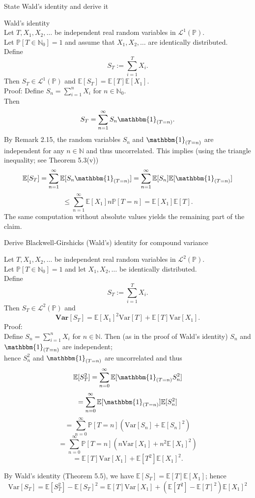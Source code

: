 \documentclass[11pt,a4paper,twoside]{article}
\begin{document}
State Wald's identity and derive it

Wald’s identity \\
Let $ T, X_1, X_2, \dots $ be independent real random variables in $ \mathcal{L}^1(\mathbb{P}) $. \\
Let $ \mathbb{P}[T \in \mathbb{N}_0] = 1 $ and assume that $ X_1, X_2, \dots $ are identically distributed. \\
Define
$$
S_T := \sum_{i=1}^{T} X_i.
$$
Then $ S_T \in \mathcal{L}^1(\mathbb{P}) $ and $ \mathbb{E}[S_T] = \mathbb{E}[T] \mathbb{E}[X_1] $. \\

\newline
Proof: Define $ S_n = \sum_{i=1}^{n} X_i $ for $ n \in \mathbb{N}_0 $. \\
Then 
$$
S_T = \sum_{n=1}^{\infty} S_n \mathbbm{1}_{(T=n)}.
$$
By Remark 2.15, the random variables $ S_n $ and $ \mathbbm{1}_{(T=n)} $ are independent for any $ n \in \mathbb{N} $ and thus uncorrelated. This implies (using the triangle inequality; see Theorem 5.3(v)) \\
$$
\mathbb{E}[S_T] = \sum_{n=1}^{\infty} \mathbb{E}[S_n \mathbbm{1}_{(T=n)}] 
= \sum_{n=1}^{\infty} \mathbb{E}[S_n] \mathbb{E}[\mathbbm{1}_{(T=n)}]
$$
$$
\leq \sum_{n=1}^{\infty} \mathbb{E}[X_1] n \mathbb{P}[T = n] = \mathbb{E}[X_1] \mathbb{E}[T].
$$
The same computation without absolute values yields the remaining part of the claim.

Derive Blackwell-Girshicks (Wald's) identity for compound variance 

Let $T, X_1, X_2, \dots$ be independent real random variables in $\mathcal{L}^2(\mathbb{P})$. \\
Let $\mathbb{P}[T \in \mathbb{N}_0] = 1$ and let $X_1, X_2, \dots$ be identically distributed. \\
Define 
$$ S_T := \sum_{i=1}^{T} X_i. $$  
Then $S_T \in \mathcal{L}^2(\mathbb{P})$ and  
$$ \textbf{Var}[S_T] = \mathbb{E}[X_1]^2 \text{Var}[T] + \mathbb{E}[T] \text{Var}[X_1]. $$
Proof: \\
Define $S_n = \sum_{i=1}^{n} X_i$ for $n \in \mathbb{N}$. Then (as in the proof of Wald’s identity) $S_n$ and $\mathbbm{1}_{(T=n)}$ are independent; \\
hence $S_n^2$ and $\mathbbm{1}_{(T=n)}$ are uncorrelated and thus \\
$$ \mathbb{E}[S_T^2] = \sum_{n=0}^{\infty} \mathbb{E}[\mathbbm{1}_{(T=n)} S_n^2] $$  
$$ = \sum_{n=0}^{\infty} \mathbb{E}[\mathbbm{1}_{(T=n)}] \mathbb{E}[S_n^2] $$  
$$ = \sum_{n=0}^{\infty} \mathbb{P}[T = n] (\text{Var}[S_n] + \mathbb{E}[S_n]^2) $$  
$$ = \sum_{n=0}^{\infty} \mathbb{P}[T = n] (n \text{Var}[X_1] + n^2 \mathbb{E}[X_1]^2) $$  
$$ = \mathbb{E}[T] \text{Var}[X_1] + \mathbb{E}[T^2] \mathbb{E}[X_1]^2. $$  

By Wald’s identity (Theorem 5.5), we have $\mathbb{E}[S_T] = \mathbb{E}[T] \mathbb{E}[X_1]$; hence 
$$ \text{Var}[S_T] = \mathbb{E}[S_T^2] - \mathbb{E}[S_T]^2 = \mathbb{E}[T] \text{Var}[X_1] + (\mathbb{E}[T^2] - \mathbb{E}[T]^2) \mathbb{E}[X_1]^2$$
\end{document}
